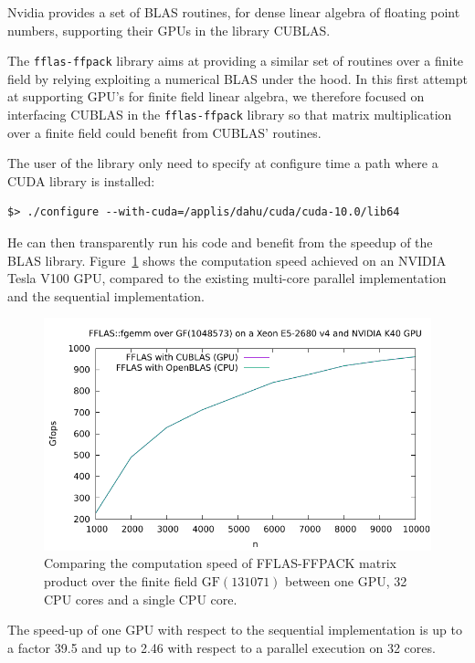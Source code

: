 Nvidia provides a set of BLAS routines, for dense linear algebra of floating point numbers, supporting their GPUs in the
library CUBLAS.

The \texttt{fflas-ffpack} library aims at providing a similar set of routines over a finite field by relying exploiting a
numerical BLAS under the hood. In this first attempt at supporting GPU's for finite field linear algebra, we therefore
focused on interfacing CUBLAS in the \texttt{fflas-ffpack} library so that matrix multiplication over a finite field
could benefit from CUBLAS' routines.

The user of the library only need to specify at configure time a path where a CUDA library is installed:
\begin{verbatim}
$> ./configure --with-cuda=/applis/dahu/cuda/cuda-10.0/lib64
\end{verbatim}

He can then transparently run his code and benefit from the speedup of the BLAS library. Figure~\ref{fig:fgemm_gpu}
shows the computation speed achieved on an NVIDIA Tesla V100 GPU, compared to the existing multi-core parallel
implementation and the sequential implementation.

\begin{figure}[htb]
\begin{center}
  \includegraphics[width=.9\textwidth]{Pictures/fgemm_GPUvsCPU}
\end{center}
\caption{Comparing the computation speed of FFLAS-FFPACK matrix product over the finite field $\text{GF}(131071)$
  between one GPU, 32 CPU cores and a single CPU core.}\label{fig:fgemm_gpu}
\end{figure}
The speed-up of one GPU with respect to the sequential implementation is up to a factor 39.5 and up to 2.46 with respect
to a parallel execution on 32 cores.

